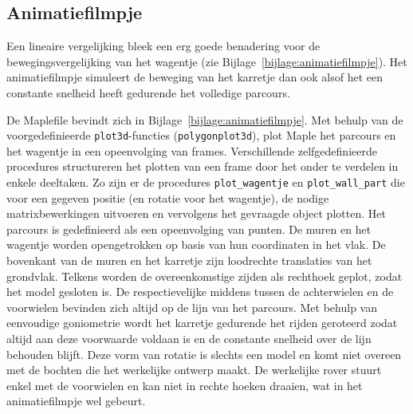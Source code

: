 \subsection{Animatiefilmpje}

Een lineaire vergelijking bleek een erg goede benadering voor de bewegingsvergelijking van het wagentje (zie Bijlage~\ref{bijlage:animatiefilmpje}).
Het animatiefilmpje simuleert de beweging van het karretje dan ook alsof het een constante snelheid heeft gedurende het volledige parcours.

De Maplefile bevindt zich in Bijlage~\ref{bijlage:animatiefilmpje}. Met behulp van de voorgedefinieerde \verb|plot3d|-functies (\verb|polygonplot3d|), plot Maple het parcours en het wagentje in een opeenvolging van frames.
Verschillende zelfgedefinieerde procedures structureren het plotten van een frame door het onder te verdelen in enkele deeltaken. Zo zijn er de procedures \verb|plot_wagentje| en \verb|plot_wall_part| die voor een gegeven positie (en rotatie voor het wagentje), de nodige matrixbewerkingen uitvoeren en vervolgens het gevraagde object plotten.
Het parcours is gedefinieerd als een opeenvolging van punten. De muren en het wagentje worden opengetrokken op basis van hun coordinaten in het vlak. De bovenkant van de muren en het karretje zijn loodrechte translaties van het grondvlak. Telkens worden de overeenkomstige zijden als rechthoek geplot, zodat het model gesloten is.
De respectievelijke middens tussen de achterwielen en de voorwielen bevinden zich altijd op de lijn van het parcours. Met behulp van eenvoudige goniometrie wordt het karretje gedurende het rijden geroteerd zodat altijd aan deze voorwaarde voldaan is en de constante snelheid over de lijn behouden blijft. Deze vorm van rotatie is slechts een model en komt niet overeen met de bochten die het werkelijke ontwerp maakt.
De werkelijke rover stuurt enkel met de voorwielen en kan niet in rechte hoeken draaien, wat in het animatiefilmpje wel gebeurt.
